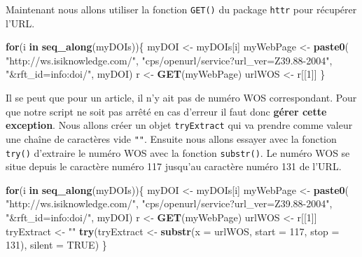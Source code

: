 \documentclass[]{book}
\newenvironment{Shaded}{\begin{snugshade}}{\end{snugshade}}
\newcommand{\KeywordTok}[1]{\textcolor[rgb]{0.13,0.29,0.53}{\textbf{#1}}}
\newcommand{\DataTypeTok}[1]{\textcolor[rgb]{0.13,0.29,0.53}{#1}}
\newcommand{\DecValTok}[1]{\textcolor[rgb]{0.00,0.00,0.81}{#1}}
\newcommand{\StringTok}[1]{\textcolor[rgb]{0.31,0.60,0.02}{#1}}
\newcommand{\OtherTok}[1]{\textcolor[rgb]{0.56,0.35,0.01}{#1}}
\newcommand{\ControlFlowTok}[1]{\textcolor[rgb]{0.13,0.29,0.53}{\textbf{#1}}}
\newcommand{\NormalTok}[1]{#1}
\theoremstyle{definition}
\theoremstyle{definition}
\theoremstyle{definition}
\theoremstyle{remark}
\begin{document}
Maintenant nous allons utiliser la fonction \texttt{GET()} du package
\texttt{httr} pour récupérer l'URL.

\begin{Shaded}
\begin{Highlighting}[]
\ControlFlowTok{for}\NormalTok{(i }\ControlFlowTok{in} \KeywordTok{seq_along}\NormalTok{(myDOIs))\{}
\NormalTok{  myDOI <-}\StringTok{ }\NormalTok{myDOIs[i]}
\NormalTok{  myWebPage <-}\StringTok{ }\KeywordTok{paste0}\NormalTok{(}
    \StringTok{"http://ws.isiknowledge.com/"}\NormalTok{, }
    \StringTok{"cps/openurl/service?url_ver=Z39.88-2004"}\NormalTok{, }
    \StringTok{"&rft_id=info:doi/"}\NormalTok{, myDOI)}
\NormalTok{  r <-}\StringTok{ }\KeywordTok{GET}\NormalTok{(myWebPage)}
\NormalTok{  urlWOS <-}\StringTok{ }\NormalTok{r[[}\DecValTok{1}\NormalTok{]]}
\NormalTok{\}}
\end{Highlighting}
\end{Shaded}

Il se peut que pour un article, il n'y ait pas de numéro WOS
correspondant. Pour que notre script ne soit pas arrêté en cas d'erreur
il faut donc \textbf{gérer cette exception}. Nous allons créer un objet
\texttt{tryExtract} qui va prendre comme valeur une chaîne de caractères
vide \texttt{""}. Ensuite nous allons essayer avec la fonction
\texttt{try()} d'extraire le numéro WOS avec la fonction
\texttt{substr()}. Le numéro WOS se situe depuis le caractère numéro 117
jusqu'au caractère numéro 131 de l'URL.

\begin{Shaded}
\begin{Highlighting}[]
\ControlFlowTok{for}\NormalTok{(i }\ControlFlowTok{in} \KeywordTok{seq_along}\NormalTok{(myDOIs))\{}
\NormalTok{  myDOI <-}\StringTok{ }\NormalTok{myDOIs[i]}
\NormalTok{  myWebPage <-}\StringTok{ }\KeywordTok{paste0}\NormalTok{(}
    \StringTok{"http://ws.isiknowledge.com/"}\NormalTok{, }
    \StringTok{"cps/openurl/service?url_ver=Z39.88-2004"}\NormalTok{, }
    \StringTok{"&rft_id=info:doi/"}\NormalTok{, myDOI)}
\NormalTok{  r <-}\StringTok{ }\KeywordTok{GET}\NormalTok{(myWebPage)}
\NormalTok{  urlWOS <-}\StringTok{ }\NormalTok{r[[}\DecValTok{1}\NormalTok{]]}
\NormalTok{  tryExtract <-}\StringTok{ ""}
  \KeywordTok{try}\NormalTok{(tryExtract <-}\StringTok{ }\KeywordTok{substr}\NormalTok{(}\DataTypeTok{x =}\NormalTok{ urlWOS, }\DataTypeTok{start =} \DecValTok{117}\NormalTok{, }\DataTypeTok{stop =} \DecValTok{131}\NormalTok{), }\DataTypeTok{silent =} \OtherTok{TRUE}\NormalTok{)}
\NormalTok{\}}
\end{Highlighting}
\end{Shaded}
\end{document}
